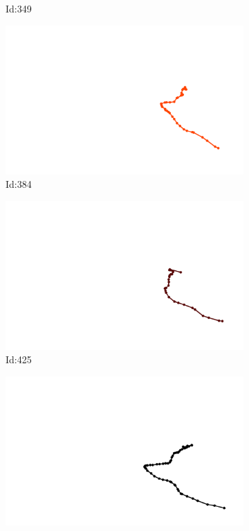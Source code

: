 \documentclass[12pt,twoside]{report}
\begin{document}
\begin{figure}
\begin{subfigure}[b]{0.20\textwidth}
\caption{Id:349}
\end{subfigure}
\begin{subfigure}[b]{0.20\textwidth}
\centering
\includegraphics[width=\textwidth]{../trajectories/384.png}
\caption{Id:384}
\end{subfigure}
\begin{subfigure}[b]{0.20\textwidth}
\centering
\includegraphics[width=\textwidth]{../trajectories/425.png}
\caption{Id:425}
\end{subfigure}
\begin{subfigure}[b]{0.20\textwidth}
\centering
\includegraphics[width=\textwidth]{../trajectories/427.png}

\end{subfigure}
\end{figure}
\end{document}
